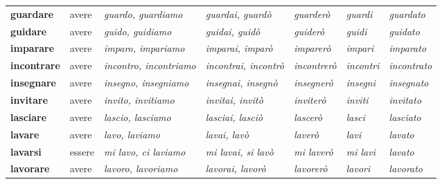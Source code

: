 \documentclass[11pt,a4paper,twoside,openright]{book}
\begin{document}
{\begin{xltabular}{\linewidth}{@{}>{\raggedright\arraybackslash}p{2.7cm} l L L l >{\raggedright\arraybackslash}p{1.9cm} l@{}}
\textbf{guardare} & avere & \textit{guardo, guardiamo} & \textit{guardai, guardò} & \textit{guarderò} & \textit{guardi} & \textit{guardato} \\
\textbf{guidare} & avere & \textit{guido, guidiamo} & \textit{guidai, guidò} & \textit{guiderò} & \textit{guidi} & \textit{guidato} \\
\textbf{imparare} & avere & \textit{imparo, impariamo} & \textit{imparai, imparò} & \textit{imparerò} & \textit{impari} & \textit{imparato} \\
\textbf{incontrare} & avere & \textit{incontro, incontriamo} & \textit{incontrai, incontrò} & \textit{incontrerò} & \textit{incontri} & \textit{incontrato} \\
\textbf{insegnare} & avere & \textit{insegno, insegniamo} & \textit{insegnai, insegnò} & \textit{insegnerò} & \textit{insegni} & \textit{insegnato} \\
\textbf{invitare} & avere & \textit{invito, invitiamo} & \textit{invitai, invitò} & \textit{inviterò} & \textit{inviti} & \textit{invitato} \\
\textbf{lasciare} & avere & \textit{lascio, lasciamo} & \textit{lasciai, lasciò} & \textit{lascerò} & \textit{lasci} & \textit{lasciato} \\
\textbf{lavare} & avere & \textit{lavo, laviamo} & \textit{lavai, lavò} & \textit{laverò} & \textit{lavi} & \textit{lavato} \\
\textbf{lavarsi} & essere & \textit{mi lavo, ci laviamo} & \textit{mi lavai, si lavò} & \textit{mi laverò} & \textit{mi lavi} & \textit{lavato} \\
\textbf{lavorare} & avere & \textit{lavoro, lavoriamo} & \textit{lavorai, lavorò} & \textit{lavorerò} & \textit{lavori} & \textit{lavorato} \\

\end{xltabular}}
\end{document}
